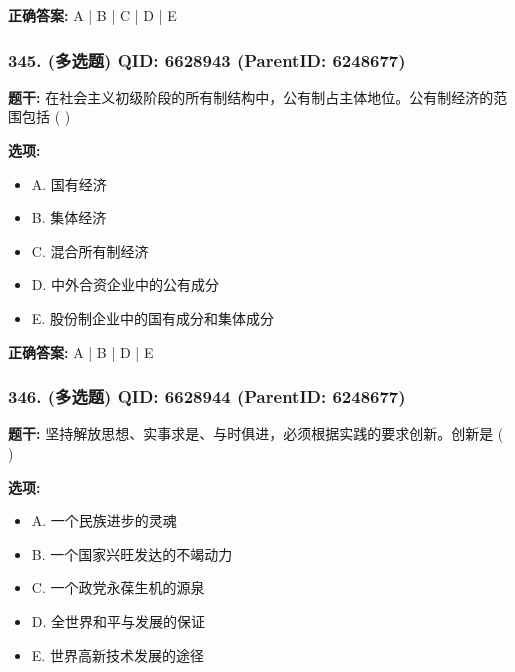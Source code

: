 \documentclass[12pt,UTF8]{ctexart}
\begin{document}
\textbf{正确答案:}
A | B | C | D | E

\vspace{0.3em}\hrulefill\vspace{0.7em}

\subsubsection*{345. (多选题) \small QID: 6628943 (ParentID: 6248677)}

\textbf{题干:}
在社会主义初级阶段的所有制结构中，公有制占主体地位。公有制经济的范围包括  ( )



\textbf{选项:}
\begin{itemize}[leftmargin=*]

  \item A. 国有经济

  \item B. 集体经济

  \item C. 混合所有制经济

  \item D. 中外合资企业中的公有成分

  \item E. 股份制企业中的国有成分和集体成分

\end{itemize}

\textbf{正确答案:}
A | B | D | E

\vspace{0.3em}\hrulefill\vspace{0.7em}

\subsubsection*{346. (多选题) \small QID: 6628944 (ParentID: 6248677)}

\textbf{题干:}
坚持解放思想、实事求是、与时俱进，必须根据实践的要求创新。创新是  ( )



\textbf{选项:}
\begin{itemize}[leftmargin=*]

  \item A. 一个民族进步的灵魂

  \item B. 一个国家兴旺发达的不竭动力

  \item C. 一个政党永葆生机的源泉

  \item D. 全世界和平与发展的保证

  \item E. 世界高新技术发展的途径

\end{itemize}
\end{document}
